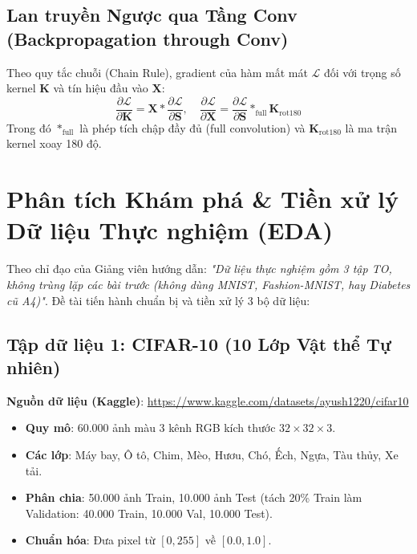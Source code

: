 \documentclass[12pt,a4paper]{report}
\begin{document}
\section{Lan truyền Ngược qua Tầng Conv (Backpropagation through Conv)}
Theo quy tắc chuỗi (Chain Rule), gradient của hàm mất mát $\mathcal{L}$ đối với trọng số kernel $\mathbf{K}$ và tín hiệu đầu vào $\mathbf{X}$:
\begin{equation}
\frac{\partial \mathcal{L}}{\partial \mathbf{K}} = \mathbf{X} * \frac{\partial \mathcal{L}}{\partial \mathbf{S}}, \quad 
\frac{\partial \mathcal{L}}{\partial \mathbf{X}} = \frac{\partial \mathcal{L}}{\partial \mathbf{S}} *_{\text{full}} \mathbf{K}_{\text{rot180}}
\end{equation}
Trong đó $*_{\text{full}}$ là phép tích chập đầy đủ (full convolution) và $\mathbf{K}_{\text{rot180}}$ là ma trận kernel xoay 180 độ.

\chapter{Phân tích Khám phá \& Tiền xử lý Dữ liệu Thực nghiệm (EDA)}

Theo chỉ đạo của Giảng viên hướng dẫn: \textit{"Dữ liệu thực nghiệm gồm 3 tập TO, không trùng lặp các bài trước (không dùng MNIST, Fashion-MNIST, hay Diabetes cũ A4)"}. Đề tài tiến hành chuẩn bị và tiền xử lý 3 bộ dữ liệu:

\section{Tập dữ liệu 1: CIFAR-10 (10 Lớp Vật thể Tự nhiên)}
\noindent \textbf{Nguồn dữ liệu (Kaggle)}: \url{https://www.kaggle.com/datasets/ayush1220/cifar10}\\[0.2cm]
\begin{itemize}
    \item \textbf{Quy mô}: 60.000 ảnh màu 3 kênh RGB kích thước $32 \times 32 \times 3$.
    \item \textbf{Các lớp}: Máy bay, Ô tô, Chim, Mèo, Hươu, Chó, Ếch, Ngựa, Tàu thủy, Xe tải.
    \item \textbf{Phân chia}: 50.000 ảnh Train, 10.000 ảnh Test (tách 20\% Train làm Validation: 40.000 Train, 10.000 Val, 10.000 Test).
    \item \textbf{Chuẩn hóa}: Đưa pixel từ $[0, 255]$ về $[0.0, 1.0]$.
\end{itemize}
\end{document}
